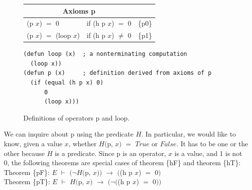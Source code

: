 \begin{figure}
\begin{center}
\begin{tabular}{lll}
\multicolumn{2}{c}{Axioms \textsf{p}}\\
\hline
\textsf{(p $x$)} $=$ \textsf{0}          & if \textsf{(h p $x$)} $=$ \textsf{0}    &\{p0\}\\
\textsf{(p $x$)} $=$ \textsf{(loop $x$)} & if \textsf{(h p $x$)} $\neq$ \textsf{0} &\{p1\}\\
\end{tabular}
\begin{code}
\begin{verbatim}
(defun loop (x)  ; a nonterminating computation
  (loop x))
(defun p (x)     ; definition derived from axioms of p
  (if (equal (h p x) 0)
      0
      (loop x)))
\end{verbatim}
\end{code}
\end{center}
\caption{Definitions of operators \textsf{p} and \textsf{loop}.}
\label{fig:paradox-op-defun}
\end{figure}

We can inquire about \textsf{p} using the predicate $H$.
In particular, we would like to know, given a value $x$,
whether $H($\textsf{p}, $x)$ $=$ $True$ or $False$.
It has to be one or the other because $H$ is a predicate.
Since \textsf{p} is an operator, $x$ is a value, and 1 is not 0,
the following theorems are special cases of
theorem \{hF\} and theorem \{hT\}:
\vspace{2mm}\\
\hspace*{5mm}Theorem \{pF\}: $E$ $\vdash$ $(\neg H($\textsf{p}, $x))$ $\rightarrow$ $($\textsf{(h p $x$)} $=$ \textsf{0}$)$ \\
\hspace*{5mm}Theorem \{pT\}: $E$ $\vdash$ $H($\textsf{p}, $x)$ $\rightarrow$ $(\neg($\textsf{(h p $x$)} $=$ \textsf{0}$))$
\vspace{2mm}

